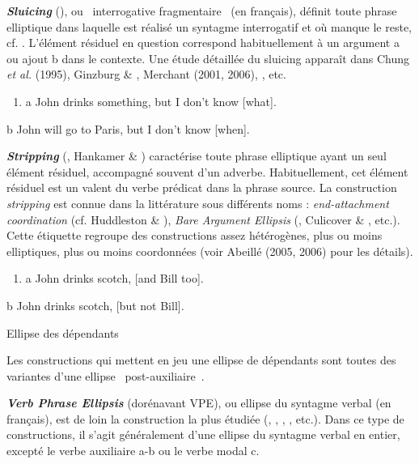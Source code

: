 \textbf{\textit{Sluicing} }(\citet{Ross1969}),\textbf{} ou {\guillemotleft}~interrogative fragmentaire~{\guillemotright} (en français), définit toute phrase elliptique dans laquelle est réalisé un syntagme interrogatif et où manque le reste, cf. . L'élément résiduel en question correspond habituellement à un argument a ou ajout b dans le contexte. Une étude détaillée du sluicing apparaît dans Chung \textit{et al.} (1995), Ginzburg \& \citet{Sag2000}, Merchant (2001, 2006), \citet{Chung2005}, etc.


\begin{enumerate}
\item \label{bkm:Ref306093193}a  John drinks something, but I don't know [what]. 


\end{enumerate}
  b  John will go to Paris, but I don't know [when].  

\textbf{\textit{Stripping}}\textbf{} (\citet{Ross1969}, Hankamer \& \citet{Sag1976}) caractérise toute phrase elliptique ayant un seul élément résiduel, accompagné souvent d'un adverbe. Habituellement, cet élément résiduel est un valent du verbe prédicat dans la phrase source. La construction \textit{stripping} est connue dans la littérature sous différents noms : \textit{end-attachment coordination} (cf. Huddleston \& \citet{Pullum2002}), \textit{Bare Argument Ellipsis} (\citet{Wilder1997}, Culicover \& \citet{Jackendoff2005}, etc.). Cette étiquette regroupe des constructions assez hétérogènes, plus ou moins elliptiques, plus ou moins coordonnées (voir Abeillé (2005, 2006) pour les détails).


\begin{enumerate}
\item a  John drinks scotch, [and Bill too]. 


\end{enumerate}
  b  John drinks scotch, [but not Bill].  

Ellipse des dépendants

Les constructions qui mettent en jeu une ellipse de dépendants sont toutes des variantes d'une ellipse {\guillemotleft}~post-auxiliaire~{\guillemotright}.

\textbf{\textit{Verb Phrase Ellipsis}} (dorénavant VPE), ou ellipse du syntagme verbal (en français), est de loin la construction la plus étudiée (\citet{Sag1976}, \citet{Hardt1993}, \citet{Johnson2001}, \citet{Dalrymple2005}, etc.). Dans ce type de constructions, il s'agit généralement d'une ellipse du syntagme verbal en entier, excepté le verbe auxiliaire a-b ou le verbe modal c. 


